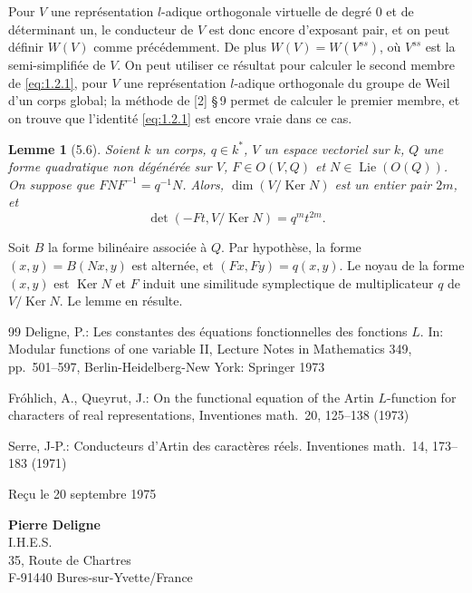 \documentclass[11pt]{amsart}
\theoremstyle{plain}
\newtheorem{lemme}[theoreme]{Lemme}
\theoremstyle{definition}
\DeclareMathOperator{\Ker}{Ker}
\DeclareMathOperator{\Lie}{Lie}
\begin{document}
Pour $V$ une repr\'esentation $l$-adique orthogonale virtuelle de degr\'e $0$ et de d\'eterminant un, le conducteur de $V$ est donc encore d'exposant pair, et on peut d\'efinir $W(V)$ comme pr\'ec\'edemment. De plus $W(V)=W(V^{ss})$, o\`u $V^{ss}$ est la semi-simplifi\'ee de $V$. On peut utiliser ce r\'esultat pour calculer le second membre de \eqref{eq:1.2.1}, pour $V$ une repr\'esentation $l$-adique orthogonale du groupe de Weil d'un corps global; la m\'ethode de [2] \S\,9 permet de calculer le premier membre, et on trouve que l'identit\'e \eqref{eq:1.2.1} est encore vraie dans ce cas.

\begin{lemme}[5.6]\label{lem:5.6}
Soient $k$ un corps, $q\in k^*$, $V$ un espace vectoriel sur $k$, $Q$ une forme quadratique non d\'eg\'en\'er\'ee sur $V$, $F\in O(V,Q)$ et $N\in\Lie(O(Q))$. On suppose que $FNF^{-1}=q^{-1}N$. Alors, $\dim(V/\Ker N)$ est un entier pair $2m$, et
\begin{equation}\label{eq:5.6}
\det(-Ft,V/\Ker N)=q^m t^{2m}.
\end{equation}
\end{lemme}

Soit $B$ la forme bilin\'eaire associ\'ee \`a $Q$. Par hypoth\`ese, la forme $(x,y)=B(Nx,y)$ est altern\'ee, et $(Fx,Fy)=q(x,y)$. Le noyau de la forme $(x,y)$ est $\Ker N$ et $F$ induit une similitude symplectique de multiplicateur $q$ de $V/\Ker N$. Le lemme en r\'esulte.

\begin{thebibliography}{99}
Deligne, P.: Les constantes des \'equations fonctionnelles des fonctions $L$. In: Modular functions of one variable II, Lecture Notes in Mathematics 349, pp.~501--597, Berlin-Heidelberg-New York: Springer 1973

Fr\'ohlich, A., Queyrut, J.: On the functional equation of the Artin $L$-function for characters of real representations, Inventiones math.~20, 125--138 (1973)

Serre, J-P.: Conducteurs d'Artin des caract\`eres r\'eels. Inventiones math.~14, 173--183 (1971)
\end{thebibliography}

\vspace{1em}
\noindent Re\c{c}u le 20 septembre 1975

\vspace{0.5em}
\noindent\textbf{Pierre Deligne}\\
I.H.E.S.\\
35, Route de Chartres\\
F-91440 Bures-sur-Yvette/France
\end{document}
